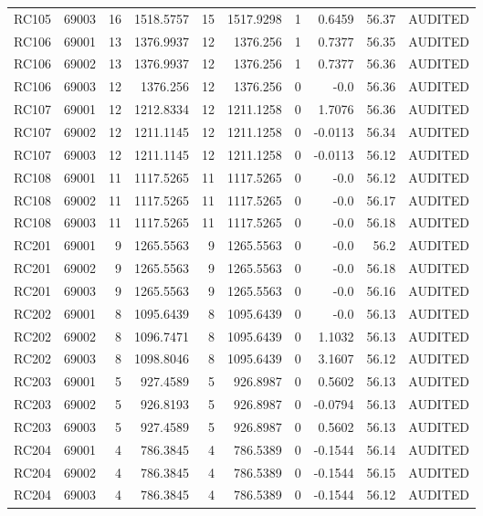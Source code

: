 \begin{tabular}{lrrrrrrrrr}
RC105 & 69003 & 16 & 1518.5757 & 15 & 1517.9298 & 1 & 0.6459 & 56.37 & AUDITED \\
RC106 & 69001 & 13 & 1376.9937 & 12 & 1376.256 & 1 & 0.7377 & 56.35 & AUDITED \\
RC106 & 69002 & 13 & 1376.9937 & 12 & 1376.256 & 1 & 0.7377 & 56.36 & AUDITED \\
RC106 & 69003 & 12 & 1376.256 & 12 & 1376.256 & 0 & -0.0 & 56.36 & AUDITED \\
RC107 & 69001 & 12 & 1212.8334 & 12 & 1211.1258 & 0 & 1.7076 & 56.36 & AUDITED \\
RC107 & 69002 & 12 & 1211.1145 & 12 & 1211.1258 & 0 & -0.0113 & 56.34 & AUDITED \\
RC107 & 69003 & 12 & 1211.1145 & 12 & 1211.1258 & 0 & -0.0113 & 56.12 & AUDITED \\
RC108 & 69001 & 11 & 1117.5265 & 11 & 1117.5265 & 0 & -0.0 & 56.12 & AUDITED \\
RC108 & 69002 & 11 & 1117.5265 & 11 & 1117.5265 & 0 & -0.0 & 56.17 & AUDITED \\
RC108 & 69003 & 11 & 1117.5265 & 11 & 1117.5265 & 0 & -0.0 & 56.18 & AUDITED \\
RC201 & 69001 & 9 & 1265.5563 & 9 & 1265.5563 & 0 & -0.0 & 56.2 & AUDITED \\
RC201 & 69002 & 9 & 1265.5563 & 9 & 1265.5563 & 0 & -0.0 & 56.18 & AUDITED \\
RC201 & 69003 & 9 & 1265.5563 & 9 & 1265.5563 & 0 & -0.0 & 56.16 & AUDITED \\
RC202 & 69001 & 8 & 1095.6439 & 8 & 1095.6439 & 0 & -0.0 & 56.13 & AUDITED \\
RC202 & 69002 & 8 & 1096.7471 & 8 & 1095.6439 & 0 & 1.1032 & 56.13 & AUDITED \\
RC202 & 69003 & 8 & 1098.8046 & 8 & 1095.6439 & 0 & 3.1607 & 56.12 & AUDITED \\
RC203 & 69001 & 5 & 927.4589 & 5 & 926.8987 & 0 & 0.5602 & 56.13 & AUDITED \\
RC203 & 69002 & 5 & 926.8193 & 5 & 926.8987 & 0 & -0.0794 & 56.13 & AUDITED \\
RC203 & 69003 & 5 & 927.4589 & 5 & 926.8987 & 0 & 0.5602 & 56.13 & AUDITED \\
RC204 & 69001 & 4 & 786.3845 & 4 & 786.5389 & 0 & -0.1544 & 56.14 & AUDITED \\
RC204 & 69002 & 4 & 786.3845 & 4 & 786.5389 & 0 & -0.1544 & 56.15 & AUDITED \\
RC204 & 69003 & 4 & 786.3845 & 4 & 786.5389 & 0 & -0.1544 & 56.12 & AUDITED \\

\end{tabular}
